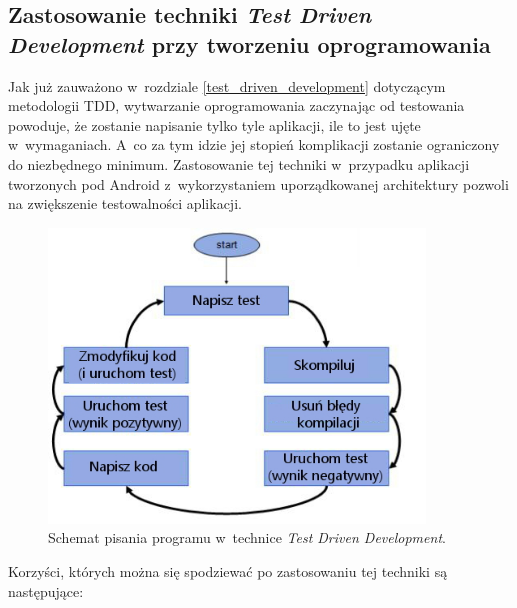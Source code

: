 \subsection{Zastosowanie techniki \textit{Test Driven Development} \newline przy tworzeniu oprogramowania}
\label{wybor_tdd}
Jak już zauważono w~rozdziale \ref{test_driven_development} dotyczącym metodologii TDD, wytwarzanie oprogramowania zaczynając od testowania powoduje, że zostanie napisanie tylko tyle aplikacji, ile to jest ujęte w~wymaganiach. A~co za tym idzie jej stopień komplikacji zostanie ograniczony do niezbędnego minimum. Zastosowanie tej techniki w~przypadku aplikacji tworzonych pod Android z~wykorzystaniem uporządkowanej architektury pozwoli na zwiększenie testowalności aplikacji. 

\begin{figure}[!htb]
    \centering
    \includegraphics[width=10cm]{imgs/ch4_tdd_pl.jpg}
    \caption
{Schemat pisania programu w~technice \textit{Test Driven Development}.}
    \label{fig:tdd_schema}
\end{figure} 

Korzyści, których można się spodziewać po zastosowaniu tej techniki są następujące:


